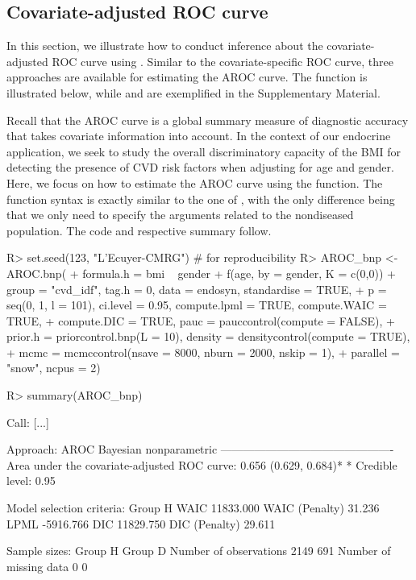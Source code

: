 \subsection{Covariate-adjusted ROC curve}\label{sec:aroc_ilu}
In this section, we illustrate how to conduct inference about the covariate-adjusted ROC curve using  . Similar to the covariate-specific ROC curve, three approaches are available for estimating the AROC curve. The function  is illustrated below, while  and  are exemplified in the Supplementary Material.

Recall that the AROC curve is a global summary measure of diagnostic accuracy that takes covariate information into account. In the context of our endocrine application, we seek to study the overall discriminatory capacity of the BMI for detecting the presence of CVD risk factors when adjusting for age and gender. Here, we focus on how to estimate the AROC curve using the  function. The function syntax is exactly similar to the one of , with the only difference being that we only need to specify the arguments related to the nondiseased population. The code and respective summary follow.
\begin{example}
R> set.seed(123, "L'Ecuyer-CMRG") # for reproducibility
R> AROC_bnp <- AROC.bnp(
+ formula.h = bmi ~ gender + f(age, by = gender, K = c(0,0))
+ group = "cvd_idf", tag.h = 0, data = endosyn, standardise = TRUE, 
+ p = seq(0, 1, l = 101), ci.level = 0.95, compute.lpml = TRUE, compute.WAIC = TRUE, 
+ compute.DIC = TRUE, pauc = pauccontrol(compute = FALSE), 
+ prior.h = priorcontrol.bnp(L = 10), density = densitycontrol(compute = TRUE),
+ mcmc = mcmccontrol(nsave = 8000, nburn = 2000, nskip = 1), 
+ parallel = "snow", ncpus = 2)

R> summary(AROC_bnp)

Call: [...]
		
Approach: AROC Bayesian nonparametric
----------------------------------------------
Area under the covariate-adjusted ROC curve: 0.656 (0.629, 0.684)*
 * Credible level:  0.95

Model selection criteria:
                     Group H
WAIC               11833.000
WAIC (Penalty)        31.236
LPML               -5916.766
DIC                11829.750
DIC (Penalty)         29.611


Sample sizes:
                           Group H     Group D
Number of observations        2149         691
Number of missing data           0           0
\end{example}

